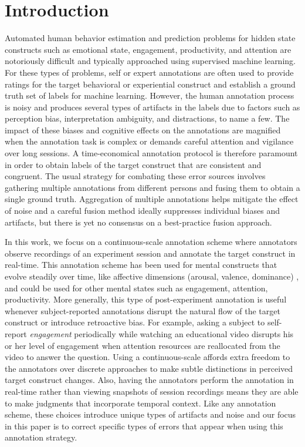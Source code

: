 \documentclass[10pt,letterpaper]{article}
\begin{document}
\section*{Introduction}
Automated human behavior estimation and prediction problems for hidden state constructs such as emotional state, engagement, productivity, and attention are notoriously difficult and typically approached using supervised machine learning.  For these types of problems, self or expert annotations are often used to provide ratings for the target behavioral or experiential construct and establish a ground truth set of labels for machine learning.  However, the human annotation process is noisy and produces several types of artifacts in the labels due to factors such as perception bias, interpretation ambiguity, and distractions, to name a few.  The impact of these biases and cognitive effects on the annotations are magnified when the annotation task is complex or demands careful attention and vigilance over long sessions.  A time-economical annotation protocol is therefore paramount in order to obtain labels of the target construct that are consistent and congruent.  The usual strategy for combating these error sources involves gathering multiple annotations from different persons and fusing them to obtain a single ground truth.  Aggregation of multiple annotations helps mitigate the effect of noise and a careful fusion method ideally suppresses individual biases and artifacts, but there is yet no consensus on a best-practice fusion approach.

In this work, we focus on a continuous-scale annotation scheme where annotators observe recordings of an experiment session and annotate the target construct in real-time.  This annotation scheme has been used for mental constructs that evolve steadily over time, like affective dimensions (arousal, valence, dominance) \cite{mckeown2012semaine, metallinou2013tracking, metallinou2013annotation, ringeval2013introducing, valstar2016avec}, and could be used for other mental states such as engagement, attention, productivity. More generally, this type of post-experiment annotation is useful whenever subject-reported annotations disrupt the natural flow of the target construct or introduce retroactive bias. For example, asking a subject to self-report \textit{engagement} periodically while watching an educational video disrupts his or her level of engagement when attention resources are reallocated from the video to answer the question.  Using a continuous-scale affords extra freedom to the annotators over discrete approaches to make subtle distinctions in perceived target construct changes.  Also, having the annotators perform the annotation in real-time rather than viewing snapshots of session recordings means they are able to make judgments that incorporate temporal context.  Like any annotation scheme, these choices introduce unique types of artifacts and noise and our focus in this paper is to correct specific types of errors that appear when using this annotation strategy.
\end{document}
